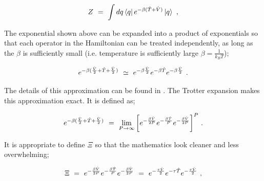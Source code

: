 \documentclass{ece}
\begin{document}
\begin{equation} \label{eq:4}
Z  \hspace{0.125cm} = \hspace{0.125cm} \int dq \bra{q} e^{-\beta ( \hat{T} + \hat{V} )}\ket{q} \hspace{0.125cm} , 
\end{equation}

The exponential shown above can be expanded into a product of exponentials so that each operator in the Hamiltonian can be treated independently, as long as the \begin{math} \beta \end{math} is sufficiently small (i.e. temperature is sufficiently large \begin{math} \beta = \frac{1}{k_B T} \end{math}); 

\begin{equation} \label{eq:5}
e^{-\beta ( \frac{\hat{V}}{2} + \hat{T} + \frac{\hat{V}}{2} )} \hspace{0.125cm} \simeq \hspace{0.125cm} e^{-\beta \frac{\hat{V}}{2}} e^{-\beta \hat{T}} e^{-\beta \frac{\hat{V}}{2}} \hspace{0.125cm} .
\end{equation}

The details of this approximation can be found in . The Trotter expansion makes this approximation exact. It is defined as;

\begin{equation} \label{eq:10}
e^{-\beta ( \frac{\hat{V}}{2} + \hat{T} + \frac{\hat{V}}{2} )} \hspace{0.125cm} = \hspace{0.125cm} \lim_{P \rightarrow \infty} \bigg[ e^{- \frac{\beta \hat{V}}{2P}} e^{- \frac{\beta \hat{T}}{P}} e^{- \frac{\beta \hat{V}}{2P}} \bigg]^P \hspace{0.125cm} .  
\end{equation}

It is appropriate to define \begin{math} \Xi \end{math} so that the mathematics look cleaner and less overwhelming;

\begin{equation} \label{eq:11}
\Xi \hspace{0.125cm} = \hspace{0.125cm} e^{-\frac{\beta \hat{V}}{2 P}} e^{- \frac{\beta \hat{T}}{P}} e^{- \frac{\beta \hat{V}}{2 P}} \hspace{0.125cm} = \hspace{0.125cm}  e^{-\frac{\tau \hat{V}}{2}} e^{- \tau \hat{T}}  e^{-\frac{\tau \hat{V}}{2}} \hspace{0.125cm} ,
\end{equation}
\end{document}
